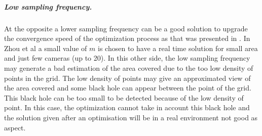 \subparagraph{Low sampling frequency.}
At the opposite a lower sampling frequency can be a good solution to upgrade the convergence speed of the optimization process as that was presented in \cite{8*zhou2011}. In Zhou et al \cite{8*zhou2011} a small value of $m$ is chosen to have a real time solution for small area and just few cameras (up to  20). 
In this other side, the low sampling frequency may generate a bad estimation of the area covered due to the too low density of points in the grid. The low density of points may give an approximated view of the area covered and some black hole can appear between the point of the grid. This black hole can be too small to be detected because of the low density of point. In this case, the optimization cannot take in account this black hole and the solution given after an optimisation will be in a real environment not good as aspect. \\



